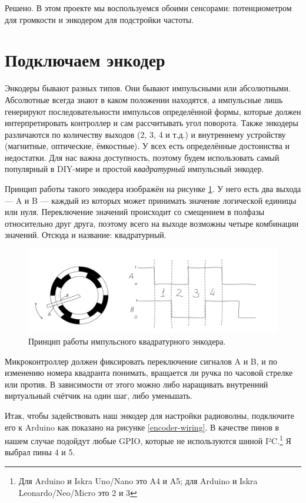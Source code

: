 Решено. В этом проекте мы воспользуемся обоими сенсорами: потенциометром для громкости и энкодером для подстройки частоты.

\section{Подключаем энкодер}

Энкодеры бывают разных типов. Они бывают импульсными или абсолютными. Абсолютные всегда знают в каком положении находятся, а импульсные лишь генерируют последовательности импульсов определённой формы, которые должен интерпретировать контроллер и сам рассчитывать угол поворота. Также энкодеры различаются по количеству выходов (2, 3, 4 и т.д.) и внутреннему устройству (магнитные, оптические, ёмкостные). У всех есть определённые достоинства и недостатки. Для нас важна доступность, поэтому будем использовать самый популярный в DIY-мире и простой \emph{квадратурный} импульсный энкодер.

Принцип работы такого энкодера изображён на рисунке \ref{fig:quadrature-encoder}. У него есть два выхода — A и B — каждый из которых может принимать значение логической единицы или нуля. Переключение значений происходит со смещением в полфазы относительно друг друга, поэтому всего на выходе возможны четыре комбинации значений. Отсюда и название: квадратурный.

\begin{figure}
  \centering
  \includegraphics{sketches/quadrature-encoder-internals}
  \caption{Принцип работы импульсного квадратурного энкодера.}
  \label{fig:quadrature-encoder}
\end{figure}

Микроконтроллер должен фиксировать переключение сигналов A и B, и по изменению номера квадранта понимать, вращается ли ручка по часовой стрелке или против. В зависимости от этого можно либо наращивать внутренний виртуальный счётчик на один шаг, либо уменьшать.

Итак, чтобы задействовать наш энкодер для настройки радиоволны, подключите его к Arduino как показано на рисунке \ref{encoder-wiring}. В качестве пинов в нашем случае подойдут любые GPIO, которые не используются шиной I²C.\footnote{Для Arduino и Iskra Uno/Nano это A4 и A5; для Arduino и Iskra Leonardo/Neo/Micro это 2 и 3} Я выбрал пины 4 и 5.


